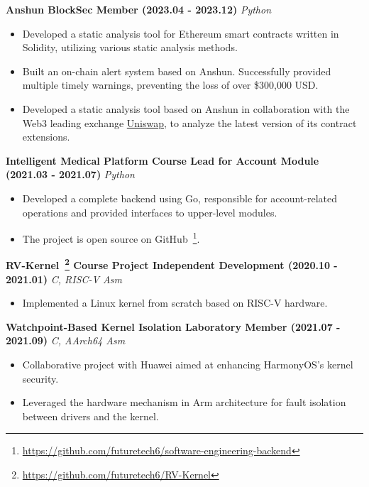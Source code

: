     \noindent\textbf{Anshun \textbar{} BlockSec \textbar{} Member (2023.04 - 2023.12)} \hfill \textsl{Python}

    \begin{itemize}
        \item Developed a static analysis tool for Ethereum smart contracts written in Solidity, utilizing various static analysis methods.
        \item Built an on-chain alert system based on Anshun. Successfully provided multiple timely warnings, preventing the loss of over \$300,000 USD.
        \item Developed a static analysis tool based on Anshun in collaboration with the Web3 leading exchange \href{https://defillama.com/protocols/Dexes}{Uniswap}, to analyze the latest version of its contract extensions.
    \end{itemize}


    \ifdefined\qr

        \noindent\textbf{Intelligent Medical Platform \textbar{} Course \textbar{} Lead for Account Module (2021.03 - 2021.07)} \hfill \textsl{Python}

        \begin{itemize}
            \item Developed a complete backend using Go, responsible for account-related operations and provided interfaces to upper-level modules.
            \item The project is open source on GitHub~\footnote{\url{https://github.com/futuretech6/software-engineering-backend}}.
        \end{itemize}

    \fi

    \noindent\textbf{RV-Kernel~\footnote{\url{https://github.com/futuretech6/RV-Kernel}} \textbar{} Course Project \textbar{} Independent Development (2020.10 - 2021.01)} \hfill \textsl{C, RISC-V Asm}

    \begin{itemize}
        \item Implemented a Linux kernel from scratch based on RISC-V hardware.
    \end{itemize}

    \noindent\textbf{Watchpoint-Based Kernel Isolation \textbar{} Laboratory \textbar{} Member (2021.07 - 2021.09)} \hfill \textsl{C, AArch64 Asm}

    \begin{itemize}
        \item Collaborative project with Huawei aimed at enhancing HarmonyOS's kernel security.
        \item Leveraged the hardware mechanism in Arm architecture for fault isolation between drivers and the kernel.
    \end{itemize}

